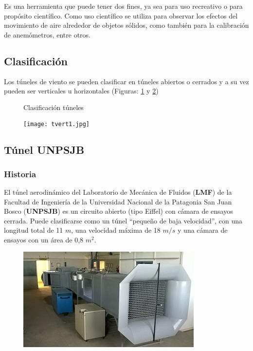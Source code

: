 


\begin{tcolorbox}[colback=blue!5!white,colframe=blue!75!black,title=Túnel de viento]
Es una herramienta que puede tener dos fines, ya sea para uso recreativo o para propósito científico.
Como uso científico se utiliza para observar los efectos del movimiento de aire alrededor de objetos sólidos, como también para la calibración de anemómetros, entre otros.
\end{tcolorbox}


\subsection{Clasificación}
Los túneles de viento se pueden clasificar en túneles abiertos o cerrados y a su vez pueden ser verticales u horizontales (Figuras: \ref{fig:abierto} y \ref{fig:tunelRec})


\begin{figure}[htbp]
    \centering
    \caption{Clasificación túneles} \label{fig:abierto}
    \end{figure}

\begin{figure}[htb]
	\centering
	\texttt{[image: tvert1.jpg]}
	\label{fig:tunelRec}
\end{figure}

\subsection{Túnel UNPSJB}

\subsubsection{Historia}
\cite{tunelweb}	El túnel aerodinámico del Laboratorio de Mecánica de Fluidos (\textbf{LMF}) de la Facultad de Ingeniería de la Universidad Nacional de la Patagonia San Juan Bosco (\textbf{UNPSJB}) es un circuito abierto (tipo Eiffel) con cámara de ensayos cerrada. Puede clasificarse como un túnel “pequeño de baja velocidad”, con una longitud total de 11 $m$, una velocidad máxima de 18 $m/s$ y una cámara de ensayos con un área de 0,8 $m^2$.
	
	\begin{figure}[htb]
		\centering
		\includegraphics[scale=0.9]{tunel_unpsjb.JPG}
		\label{fig:tunelUni}
	\end{figure}
	
